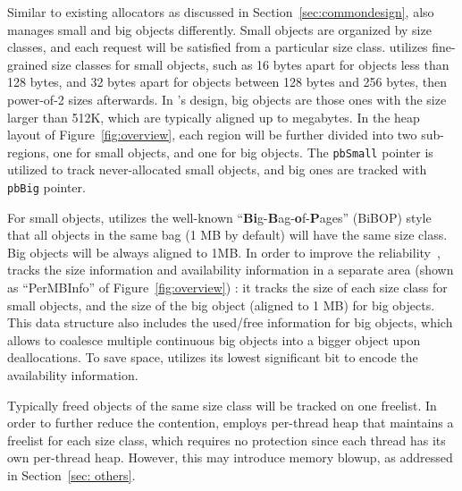 
Similar to existing allocators as discussed in Section~\ref{sec:commondesign}, \NM{} also manages small and big objects differently. Small objects are organized by size classes, and each request will be satisfied from a particular size class. \NA{} utilizes fine-grained size classes for small objects, such as 16 bytes apart for objects less than 128 bytes, and 32 bytes apart for objects between 128 bytes and 256 bytes, then power-of-2 sizes afterwards. In \NM{}'s design, big objects are those ones with the size larger than 512K, which are typically aligned up to megabytes. In the heap layout of Figure~\ref{fig:overview}, each region will be further divided into two sub-regions, one for small objects, and one for big objects. The \texttt{pbSmall} pointer is utilized to track never-allocated small objects, and big ones are tracked with \texttt{pbBig} pointer. 

For small objects, \NM{} utilizes the well-known  ``\textbf{Bi}g-\textbf{B}ag-\textbf{o}f-\textbf{P}ages'' (BiBOP) style that all objects in the same bag (1 MB by default) will have the same size class. Big objects will be always aligned to 1MB. In order to improve the reliability~\cite{FreeGuard, Guarder}, \NM{} tracks the size information and availability information in a separate area (shown as ``PerMBInfo'' of Figure~\ref{fig:overview}) : it tracks the size of each size class for small objects, and the size of the big object (aligned to 1 MB) for big objects. This data structure also includes the used/free information for big objects, which allows to coalesce multiple continuous big objects into a bigger object upon deallocations. To save space, \NM{} utilizes its lowest significant bit to encode the availability information.

Typically freed objects of the same size class will be tracked on one freelist. In order to further reduce the contention, \NM{} employs per-thread heap that maintains a freelist for each size class, which requires no protection since each thread has its own per-thread heap. However, this may introduce memory blowup, as addressed in Section~\ref{sec: others}. 

